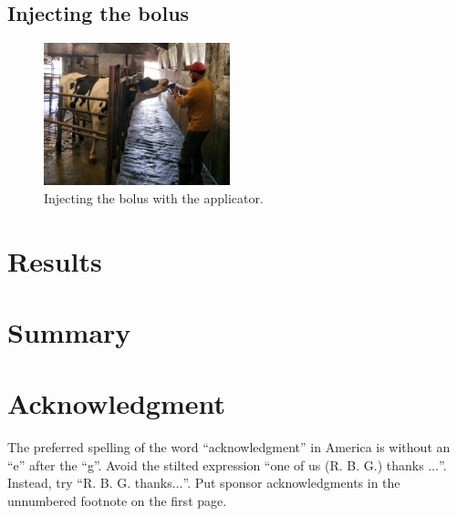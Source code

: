 \documentclass[conference]{IEEEtran}
\begin{document}
\subsection{Injecting the bolus}

\begin{figure}[htbp]
\centerline{\includegraphics[width=0.48\textwidth]{fig/bolus_application.jpg}}
  \caption{Injecting the bolus with the applicator.}
\label{bolus-gw-photo}
\end{figure}


\section{Results}



\section{Summary}

\section*{Acknowledgment}

The preferred spelling of the word ``acknowledgment'' in America is without 
an ``e'' after the ``g''. Avoid the stilted expression ``one of us (R. B. 
G.) thanks $\ldots$''. Instead, try ``R. B. G. thanks$\ldots$''. Put sponsor 
acknowledgments in the unnumbered footnote on the first page.



\end{document}
